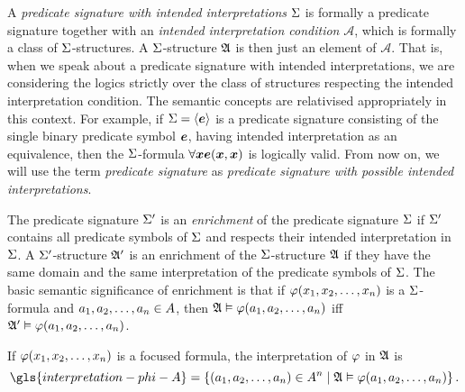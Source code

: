 
A \emph{predicate signature with intended interpretations} $\mathrm{\Sigma}$ is formally a
predicate signature together with an \emph{intended interpretation condition}
$\mathcal{A}$, which is formally a class of $\mathrm{\Sigma}$-structures.
A $\mathrm{\Sigma}$-structure $\mathfrak{A}$ is then just an element of $\mathcal{A}$. That is,
when we speak about a predicate signature with intended interpretations,
we are considering the logics strictly over the class of structures respecting
the intended interpretation condition. The semantic concepts are relativised
appropriately in this context. For example, if $\mathrm{\Sigma} = \left\langle \bm{e} \right\rangle$ is a
predicate signature consisting of the single binary predicate symbol $\bm{e}$,
having intended interpretation as an equivalence, then the $\mathrm{\Sigma}$-formula
$\forall\bm{x} \bm{e}(\bm{x},\bm{x})$ is logically valid.
From now on, we will use the term \emph{predicate signature} as \emph{predicate
signature with possible intended interpretations}.

The predicate signature $\mathrm{\Sigma'}$ is an \emph{enrichment} of the predicate
signature $\mathrm{\Sigma}$ if $\mathrm{\Sigma'}$ contains all predicate symbols of $\mathrm{\Sigma}$ and
respects their intended interpretation in $\mathrm{\Sigma}$. A $\mathrm{\Sigma'}$-structure $\mathfrak{A'}$
is an enrichment of the $\mathrm{\Sigma}$-structure $\mathfrak{A}$ if they have the same domain
and the same interpretation of the predicate symbols of $\mathrm{\Sigma}$.
The basic semantic significance of enrichment is that if
$\varphi(x_{1}, x_{2}, \dots, x_{n})$ is a $\mathrm{\Sigma}$-formula and $a_{1}, a_{2},
\dots, a_{n} \in A$, then $\mathfrak{A} \vDash \varphi(a_{1}, a_{2}, \dots, a_{n})$
iff $\mathfrak{A'} \vDash \varphi(a_{1}, a_{2}, \dots, a_{n})$.

If $\varphi(x_{1}, x_{2}, \dots, x_{n})$ is a focused formula, the
interpretation of $\varphi$ in $\mathfrak{A}$ is
\[
  \gls{interpretation-phi-A} = \setbd{(\eaa1, \eaa2, \dots, \eaa\nn) \in
  \domA^\nn}{\StrA \vDash \fphi(\eaa1, \eaa2, \dots, \eaa\nn)}.
\]